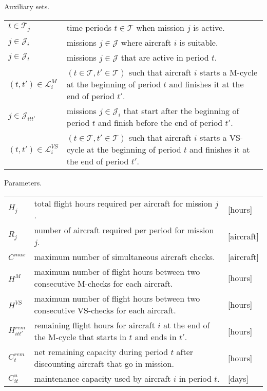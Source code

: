 Auxiliary sets.

  \begin{tabular}{p{15mm}p{120mm}}
    $t \in \mathcal{T}_j$        &  time periods $t \in \mathcal{T}$ when mission $j$ is active. \\
    $j \in \mathcal{J}_i$        &  missions $j \in \mathcal{J}$ where aircraft $i$ is suitable. \\
    $j \in \mathcal{J}_t$        &  missions $j \in \mathcal{J}$ that are active in period $t$. \\
    $(t, t') \in \mathcal{L}^{M}_{i}$         & $(t \in \mathcal{T}, t' \in \mathcal{T})$ such that aircraft $i$ starts a M-cycle at the beginning of period $t$ and finishes it at the end of period $t'$. \\
    $j \in \mathcal{J}_{itt'}$         & missions $j \in \mathcal{J}_i$ that start after the beginning of period $t$ and finish before the end of period $t'$.\\
    $(t, t') \in \mathcal{L}^{VS}_{i}$         & $(t \in \mathcal{T}, t' \in \mathcal{T})$ such that aircraft $i$ starts a VS-cycle at the beginning of period $t$ and finishes it at the end of period $t'$.\\
  \end{tabular}

  Parameters.

  \begin{tabular}{p{15mm}p{100mm}p{20mm}}
    $H_j$             & total flight hours required per aircraft for mission $j$. & [hours] \\
    $R_j$             & number of aircraft required per period for mission $j$. & [aircraft] \\
    $C^{max}$         & maximum number of simultaneous aircraft checks. & [aircraft] \\
    $H^{M}$         & maximum number of flight hours between two consecutive M-checks for each aircraft. & [hours] \\
    $H^{VS}$         & maximum number of flight hours between two consecutive VS-checks for each aircraft. & [hours] \\
    $H^{rem}_{itt'}$ & remaining flight hours for aircraft $i$ at the end of the M-cycle that starts in $t$ and ends in $t'$.& [hours] \\
    $C^{rem}_{t}$ & net remaining capacity during period $t$ after discounting aircraft that go in mission.& [hours] \\
    $C^{u}_{it}$ & maintenance capacity used by aircraft $i$ in period $t$. & [days] \\
  \end{tabular}



